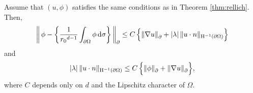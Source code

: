 \begin{lem}
  \label{lem:neumannDirichlet}
  Assume that $(u,\phi)$ satisfies the same conditions as in Theorem \ref{thm:rellich}.
  Then,
  \begin{align}
    \label{eq:phiDashintPhi}
    \bigg\|\, \phi - \bigg\{ \frac{1}{{r_0}^{d - 1}}\int_{\partial\Omega} \phi \, {\operatorname{d}\!{\sigma}} \bigg\} \, \bigg\|^{}_\partial 
    \leq C\, \Big\{ \|\nabla u\|^{}_\partial + |\lambda| \, \|u\cdot n\|_{\mathrm{H}^{-1}(\partial\Omega)} \Big\}
  \end{align}
  and
  \begin{align}
    \label{eq:lambdaun}
    |\lambda|\, \| u\cdot n \|_{\mathrm{H}^{-1}(\partial\Omega)} \leq C\, \Big\{ \|\phi\|^{}_\partial + \|\nabla u\|^{}_\partial \Big\},
  \end{align}
  where $C$ depends only on $d$ and the Lipschitz character of $\Omega$.
\end{lem}

